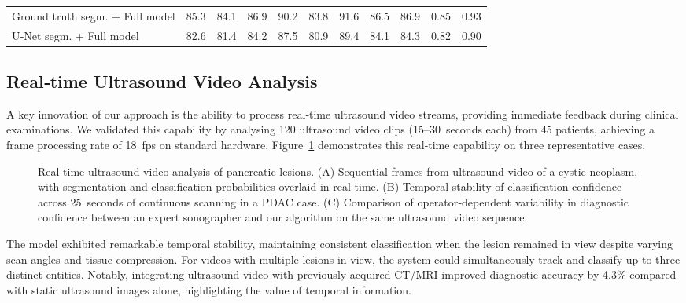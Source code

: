 \documentclass[a4paper, fleqn]{cas-dc}
\begin{document}
\begin{table}[htbp]
\begin{tabular*}{\tblwidth}{@{} l|ccccccc|ccc @{}}
            \midrule Ground truth segm. + Full model               & 85.3                                                  & 84.1                                        & 86.9          & 90.2          & 83.8             & 91.6          & 86.5              & 86.9              & 0.85          & 0.93          \\
            U‑Net segm. + Full model                               & 82.6                                                  & 81.4                                        & 84.2          & 87.5          & 80.9             & 89.4          & 84.1              & 84.3              & 0.82          & 0.90          \\
            \bottomrule
        \end{tabular*}
    \end{table}

    \subsection{Real‐time Ultrasound Video Analysis}
    A key innovation of our approach is the ability to process real‐time ultrasound
    video streams, providing immediate feedback during clinical examinations. We
    validated this capability by analysing 120 ultrasound video clips (15–30~seconds
    each) from 45 patients, achieving a frame processing rate of 18~fps on
    standard hardware. Figure~\ref{fig:us_video} demonstrates this real‐time capability
    on three representative cases.

    \begin{figure}[htbp]
        \centering
        \caption{Real‐time ultrasound video analysis of pancreatic lesions. (A) Sequential
        frames from ultrasound video of a cystic neoplasm, with segmentation and
        classification probabilities overlaid in real time. (B) Temporal stability
        of classification confidence across 25~seconds of continuous scanning in
        a PDAC case. (C) Comparison of operator‐dependent variability in
        diagnostic confidence between an expert sonographer and our algorithm on
        the same ultrasound video sequence.}
        \label{fig:us_video}
    \end{figure}

    The model exhibited remarkable temporal stability, maintaining consistent classification
    when the lesion remained in view despite varying scan angles and tissue compression.
    For videos with multiple lesions in view, the system could simultaneously track
    and classify up to three distinct entities. Notably, integrating ultrasound video
    with previously acquired CT/MRI improved diagnostic accuracy by 4.3\%
    compared with static ultrasound images alone, highlighting the value of temporal
    information.
\end{document}
